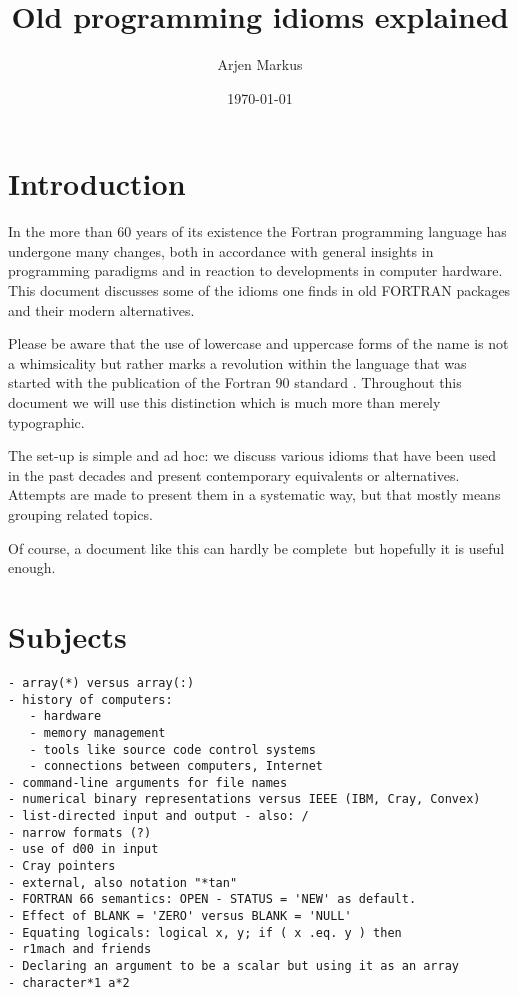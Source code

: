 \documentclass{article}
\date{\today}
\author{Arjen Markus}
\title{Old programming idioms explained}
\begin{document}
\maketitle

\tableofcontents
\newpage

\section{Introduction}
In the more than 60 years of its existence the Fortran programming
language has undergone many changes, both in accordance with general insights
in programming paradigms and in reaction to developments in computer hardware.
This document discusses some of the idioms one finds in old FORTRAN packages
and their modern alternatives.

Please be aware that the use of lowercase and uppercase forms of the name is
not a whimsicality but rather marks a revolution within the language that was
started with the publication of the Fortran 90 standard \cite{Fortran90Standard}. Throughout
this document we will use this distinction which is much more than merely
typographic.

The set-up is simple and ad hoc: we discuss various idioms that have been
used in the past decades and present contemporary equivalents or alternatives.
Attempts are made to present them in a systematic way, but that mostly means grouping
related topics.

Of course, a document like this can hardly be complete\, but hopefully it is
useful enough.











\section{Subjects}
\begin{verbatim}
- array(*) versus array(:)
- history of computers:
   - hardware
   - memory management
   - tools like source code control systems
   - connections between computers, Internet
- command-line arguments for file names
- numerical binary representations versus IEEE (IBM, Cray, Convex)
- list-directed input and output - also: /
- narrow formats (?)
- use of d00 in input
- Cray pointers
- external, also notation "*tan"
- FORTRAN 66 semantics: OPEN - STATUS = 'NEW' as default.
- Effect of BLANK = 'ZERO' versus BLANK = 'NULL'
- Equating logicals: logical x, y; if ( x .eq. y ) then
- r1mach and friends
- Declaring an argument to be a scalar but using it as an array
- character*1 a*2
\end{verbatim}
\end{document}
